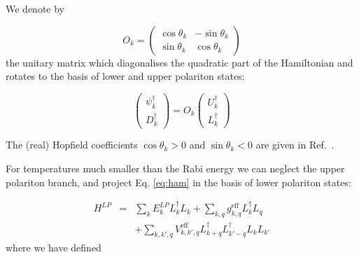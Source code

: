\documentclass[a4paper,prb,10pt,aps,twocolumn]{revtex4-1}
\begin{document}
We denote by 

\begin{equation}
O_{k}=\left(\begin{array}{cc}
\cos\theta_{k} & -\sin\theta_{k}\\
\sin\theta_{k} & \cos\theta_{k}
\end{array}\right)
\end{equation}
the unitary matrix which diagonalises the quadratic part of the Hamiltonian
and rotates to the basis of lower and upper polariton states:

\begin{equation}
  \label{eq:65}
\left(\begin{array}{c}
\psi_{k}^{\dagger}\\
D_{k}^{\dagger}
\end{array}\right)=O_{k}\left(\begin{array}{c}
U_{k}^{\dagger}\\
L_{k}^{\dagger}
\end{array}\right)  
\end{equation}

The (real) Hopfield coefficients $\cos\theta_k>0$ and $\sin\theta_{k}<0$ are given in Ref.~\cite{Ciuti_2003}.


For temperatures much smaller than the Rabi energy we can neglect
the upper polariton branch, and project Eq. \ref{eq:ham} in the basis
of lower polariton states:


\begin{eqnarray*}
H^{LP} & = & \sum_{k}E_{k}^{LP}L_{k}^{\dagger}L_{k}+\sum_{k,q}g_{k,q}^{\text{{eff}}}L_{k}^{\dagger}L_{q}\\
 &  & +\sum_{k,k',q}V_{k,k',q}^{\text{{eff}}}L_{k+q}^{\dagger}L_{k'-q}^{\dagger}L_{k}L_{k'}
\end{eqnarray*}
where we have defined
\end{document}
